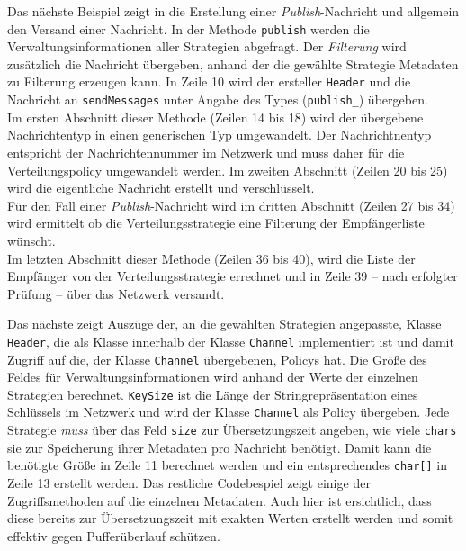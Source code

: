 Das nächste Beispiel zeigt in  die Erstellung einer \emph{Publish}-Nachricht und allgemein den Versand einer Nachricht. In der Methode \texttt{publish} werden die Verwaltungsinformationen aller Strategien abgefragt. Der \emph{Filterung} wird zusätzlich die Nachricht übergeben, anhand der die gewählte Strategie Metadaten zu Filterung erzeugen kann. In Zeile 10 wird der ersteller \texttt{Header} und die Nachricht an \texttt{sendMessages} unter Angabe des Types (\texttt{publish\_}) übergeben.\\
Im ersten Abschnitt dieser Methode (Zeilen 14 bis 18) wird der übergebene Nachrichtentyp in einen generischen Typ umgewandelt. Der Nachrichtnentyp entspricht der Nachrichtennummer im Netzwerk und muss daher für die Verteilungspolicy umgewandelt werden. Im zweiten Abschnitt (Zeilen 20 bis 25) wird die eigentliche Nachricht erstellt und verschlüsselt.\\
Für den Fall einer \emph{Publish}-Nachricht wird im dritten Abschnitt (Zeilen 27 bis 34) wird ermittelt ob die Verteilungsstrategie eine Filterung der Empfängerliste wünscht.\\
Im letzten Abschnitt dieser Methode (Zeilen 36 bis 40), wird die Liste der Empfänger von der Verteilungsstrategie errechnet und in Zeile 39 -- nach erfolgter Prüfung -- über das Netzwerk versandt.



Das nächste  zeigt Auszüge der, an die gewählten Strategien angepasste, Klasse \texttt{Header}, die als Klasse innerhalb der Klasse \texttt{Channel} implementiert ist und damit Zugriff auf die, der Klasse \texttt{Channel} übergebenen, Policys hat. Die Größe des Feldes für Verwaltungsinformationen wird anhand der Werte der einzelnen Strategien berechnet. \texttt{KeySize} ist die Länge der Stringrepräsentation eines Schlüssels im Netzwerk und wird der Klasse \texttt{Channel} als Policy übergeben. Jede Strategie \emph{muss} über das Feld \texttt{size} zur Übersetzungszeit angeben, wie viele \texttt{chars} sie zur Speicherung ihrer Metadaten pro Nachricht benötigt. Damit kann die benötigte Größe in Zeile 11 berechnet werden und ein entsprechendes \texttt{char[]} in Zeile 13 erstellt werden. Das restliche Codebespiel zeigt einige der Zugriffsmethoden auf die einzelnen Metadaten. Auch hier ist ersichtlich, dass diese bereits zur Übersetzungszeit mit exakten Werten erstellt werden und somit effektiv gegen Pufferüberlauf schützen. 



